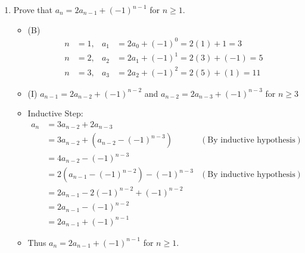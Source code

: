 \documentclass[12pt]{article}
\begin{document}
\begin{enumerate}
\begin{enumerate}
	\item Prove that $a_n=2a_{n-1}+(-1)^{n-1}$ for $n\geq1$.
		\begin{itemize}
		\item (B) 
			\begin{align*}
			n &= 1, & a_1 &= 2a_0 + (-1)^0 = 2(1) + 1 = 3 \\
			n &= 2, & a_2 &= 2a_1 + (-1)^1 = 2(3) + (-1) = 5\\
			n &= 3, & a_3 &= 2a_2 + (-1)^2 = 2(5) + (1) = 11
			\end{align*}
		\item (I) $a_{n-1}=2a_{n-2}+(-1)^{n-2}$ and  $a_{n-2}=2a_{n-3}+(-1)^{n-3}$ for $n\geq3$
		\item Inductive Step:
			\begin{align*}
			a_n &= 3a_{n-2} + 2a_{n-3} \\
			&= 3a_{n-2} + (a_{n-2}-(-1)^{n-3}) & (\text{By inductive hypothesis}) \\
			&= 4a_{n-2} - (-1)^{n-3} \\
			&= 2(a_{n-1}-(-1)^{n-2}) - (-1)^{n-3} & (\text{By inductive hypothesis}) \\
			&= 2a_{n-1} - 2(-1)^{n-2} + (-1)^{n-2} \\
			&= 2a_{n-1} - (-1)^{n-2} \\
			&= 2a_{n-1} + (-1)^{n-1}
			\end{align*}
		\item Thus $a_n=2a_{n-1}+(-1)^{n-1}$ for $n\geq1$.
		\end{itemize}
	\end{enumerate}

\end{enumerate}
\end{document}
